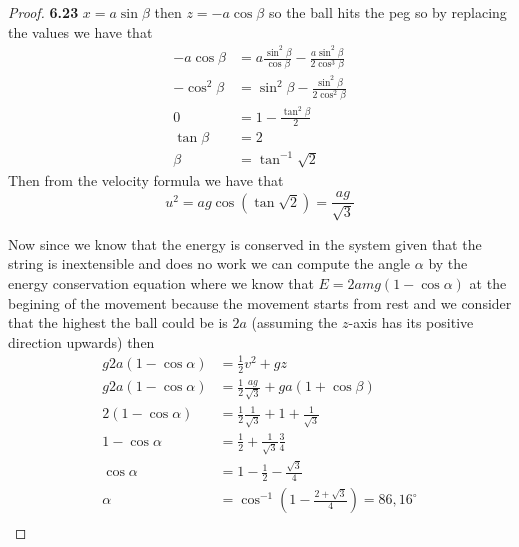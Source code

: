 \documentclass[11pt]{article}
\theoremstyle{definition}
\begin{document}
\begin{proof}{\textbf{6.23}}
        $x = a \sin\beta$ then $z = -a\cos\beta$ so the ball hits the peg so by
        replacing the values we have that
        \begin{align*}
            -a\cos\beta &= a\frac{\sin^2\beta}{\cos\beta} - \frac{a\sin^2{\beta}}{2\cos^3\beta}\\
            -\cos^2\beta &= \sin^2\beta - \frac{\sin^2{\beta}}{2\cos^2\beta}\\
            0 &= 1 - \frac{\tan^2{\beta}}{2}\\
            \tan{\beta} &= 2\\
            \beta &= \tan^{-1}{\sqrt{2}}
        \end{align*}
        Then from the velocity formula we have that
        $$u^2 = ag\cos{(\tan{\sqrt{2}})} = \frac{ag}{\sqrt{3}}$$
        
        Now since we know that the energy is conserved in the system given that the
        string is inextensible and does no work we can compute the angle $\alpha$ by
        the energy conservation equation where we know that $E = 2amg(1-\cos\alpha)$
        at the begining of the movement because the movement starts from rest and 
        we consider that the highest the ball could be is $2a$ (assuming the $z$-axis
        has its positive direction upwards) then
        \begin{align*}
            g2a(1-\cos\alpha) &= \frac{1}{2}v^2 + gz\\
            g2a(1-\cos\alpha) &= \frac{1}{2}\frac{ag}{\sqrt{3}} + ga(1 + \cos\beta)\\
            2(1-\cos\alpha) &= \frac{1}{2}\frac{1}{\sqrt{3}} + 1 + \frac{1}{\sqrt{3}}\\
            1-\cos\alpha &= \frac{1}{2} + \frac{1}{\sqrt{3}}\frac{3}{4}\\
            \cos\alpha &= 1 - \frac{1}{2} - \frac{\sqrt{3}}{4}\\
            \alpha &= \cos^{-1}(1 - \frac{2 + \sqrt{3}}{4}) = 86,16^{\circ}\\
        \end{align*} 
    \end{proof}
\end{document}
